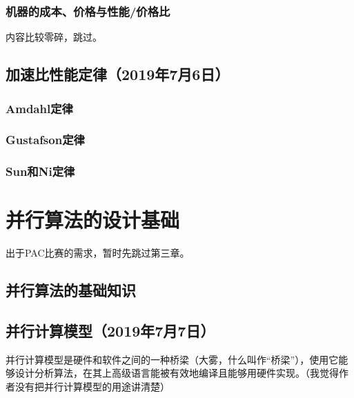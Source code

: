 \documentclass{article}
\begin{document}
			\subsubsection{机器的成本、价格与性能/价格比}
				内容比较零碎，跳过。
		\subsection{加速比性能定律（2019年7月6日）}
			\subsubsection{Amdahl定律}
			\subsubsection{Gustafson定律}
			\subsubsection{Sun和Ni定律}
	\section{并行算法的设计基础}
		出于PAC比赛的需求，暂时先跳过第三章。
		\subsection{并行算法的基础知识}
		\subsection{并行计算模型（2019年7月7日）}
			并行计算模型是硬件和软件之间的一种桥梁（大雾，什么叫作``桥梁''），使用它能够设计分析算法，在其上高级语言能被有效地编译且能够用硬件实现。（我觉得作者没有把并行计算模型的用途讲清楚）
\end{document}

